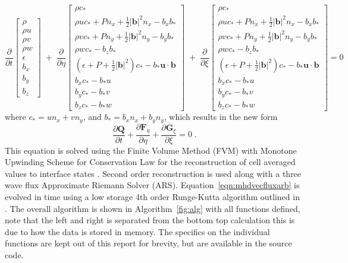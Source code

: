 \documentclass[paper=a4, fontsize=11pt]{scrartcl}
\newcommand{\pfrac}[2]{\frac{\partial#1}{\partial#2}}
\numberwithin{equation}{section}                %
\numberwithin{figure}{section}                  %
\numberwithin{table}{section}                           %
\begin{document}
\[
  \pfrac{}{t}
  \begin{bmatrix}
    \rho  \\
    \rho u  \\
    \rho v \\
    \rho w \\
    \epsilon\\
    b_x \\
    b_y \\
    b_z 
  \end{bmatrix}
  \;+\;\pfrac{}{\eta}
  \begin{bmatrix}
    \rho c_*  \\
    \rho u c_* + P n_x + \frac{1}{2}|\mathbf{b}|^2 n_x- b_x b_*\\
    \rho v c_* + P n_y + \frac{1}{2}|\mathbf{b}|^2 n_y - b_y b_* \\
    \rho w c_* - b_z b_*\\
    \left(\epsilon+ P + \frac{1}{2}|\mathbf{b}|^2 \right) c_* - b_* \mathbf{u}\cdot\mathbf{b}\\
    b_x c_* - b_* u\\
    b_y c_* - b_* v \\
    b_z c_* - b_* w 
  \end{bmatrix}
  \;+\;\pfrac{}{\xi}
  \begin{bmatrix}
    \rho c_*  \\
    \rho u c_* + P n_x + \frac{1}{2}|\mathbf{b}|^2 n_x - b_x b_* \\
    \rho v c_* + P n_y + \frac{1}{2}|\mathbf{b}|^2 n_y - b_y b_* \\
    \rho w c_* - b_z b_* \\
    \left(\epsilon+ P + \frac{1}{2}|\mathbf{b}|^2  \right) c_* - b_*\mathbf{u}\cdot\mathbf{b}\\
    b_x c_* - b_* u \\
    b_y c_* - b_* v \\
    b_z c_* - b_* w 
  \end{bmatrix}
  =0
\]
where $c_* = u n_x + v n_y$, and $b_* = b_x n_x + b_y n_y $, which results in the new form
\begin{equation} \label{eqn:mhdvecfluxarb}
  \pfrac{\mathbf{Q}}{t} + \pfrac{\mathbf{F}_\eta}{\eta} + \pfrac{\mathbf{G}_\xi}{\xi} = 0\;.
\end{equation}
This equation is solved using the Finite Volume Method (FVM) with Monotone Upwinding Scheme for Conservation Law for the reconstruction of cell averaged values to interface states \cite{van1979}. Second order reconstruction is used along with a three wave flux Approximate Riemann Solver (ARS). Equation~\ref{eqn:mhdvecfluxarb} is evolved in time using a low storage 4th order Runge-Kutta algorithm outlined in \citep{jameson1981}. The overall algorithm is shown in Algorithm~\ref{fig:alg} with all functions defined, note that the left and right is separated from the bottom top calculation this is due to how the data is stored in memory. The specifics on the individual functions are kept out of this report for brevity, but are available in the source code.
\end{document}
